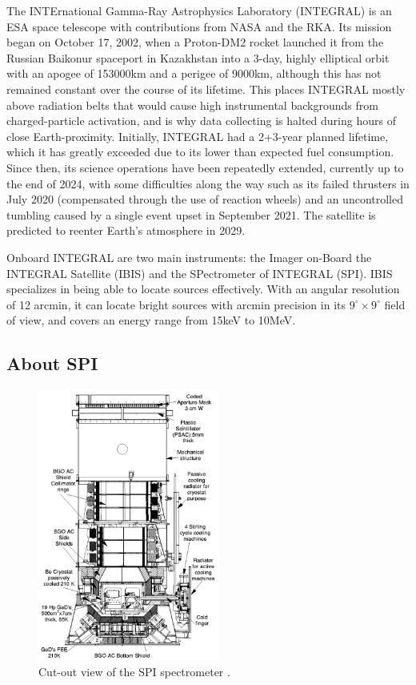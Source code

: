 \documentclass{article}
\begin{document}
The INTErnational Gamma-Ray Astrophysics Laboratory (INTEGRAL) is an ESA space telescope with contributions from NASA and the RKA. Its mission began on October 17, 2002, when a Proton-DM2 rocket launched it from the Russian Baikonur spaceport in Kazakhstan into a 3-day, highly elliptical orbit with an apogee of 153000km and a perigee of 9000km, although this has not remained constant over the course of its lifetime. This places INTEGRAL mostly above radiation belts that would cause high instrumental backgrounds from charged-particle activation, and is why data collecting is halted during hours of close Earth-proximity. Initially, INTEGRAL had a 2+3-year planned lifetime, which it has greatly exceeded due to its lower than expected fuel consumption. Since then, its science operations have been repeatedly extended, currently up to the end of 2024, with some difficulties along the way such as its failed thrusters in July 2020 (compensated through the use of reaction wheels) and an uncontrolled tumbling caused by a single event upset in September 2021. The satellite is predicted to reenter Earth's atmosphere in 2029.

Onboard INTEGRAL are two main instruments: the Imager on-Board the INTEGRAL Satellite (IBIS) and the SPectrometer of INTEGRAL (SPI). IBIS specializes in being able to locate sources effectively. With an angular resolution of 12 arcmin, it can locate bright sources with arcmin precision in its $9^\circ \times 9^\circ$ field of view, and covers an energy range from 15keV to 10MeV. 

\subsection{About SPI}

\begin{figure}
    \begin{center}
      \includegraphics[width=0.53\textwidth]{Images/General/SPI_cut_view_verdenne_2003.PNG}
    \end{center}
    \caption{Cut-out view of the SPI spectrometer \cite{refId0}.}
    \label{SPI cut view}
\end{figure}
\end{document}

